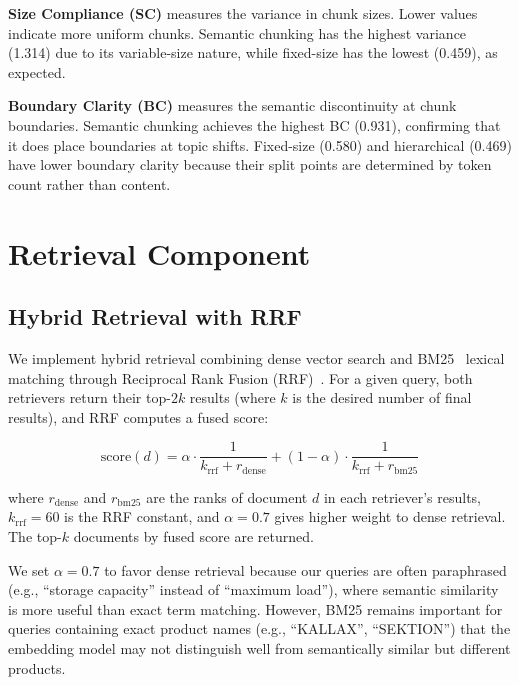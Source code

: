 \documentclass[conference]{IEEEtran}
\begin{document}
\textbf{Size Compliance (SC)} measures the variance in chunk sizes. Lower values indicate more uniform chunks. Semantic chunking has the highest variance (1.314) due to its variable-size nature, while fixed-size has the lowest (0.459), as expected.

\textbf{Boundary Clarity (BC)} measures the semantic discontinuity at chunk boundaries. Semantic chunking achieves the highest BC (0.931), confirming that it does place boundaries at topic shifts. Fixed-size (0.580) and hierarchical (0.469) have lower boundary clarity because their split points are determined by token count rather than content.

\section{Retrieval Component}

\subsection{Hybrid Retrieval with RRF}

We implement hybrid retrieval combining dense vector search and BM25~\cite{b2} lexical matching through Reciprocal Rank Fusion (RRF)~\cite{b3}. For a given query, both retrievers return their top-$2k$ results (where $k$ is the desired number of final results), and RRF computes a fused score:

\begin{equation}
\text{score}(d) = \alpha \cdot \frac{1}{k_{\text{rrf}} + r_{\text{dense}}} + (1-\alpha) \cdot \frac{1}{k_{\text{rrf}} + r_{\text{bm25}}}
\end{equation}

\noindent where $r_{\text{dense}}$ and $r_{\text{bm25}}$ are the ranks of document $d$ in each retriever's results, $k_{\text{rrf}}=60$ is the RRF constant, and $\alpha=0.7$ gives higher weight to dense retrieval. The top-$k$ documents by fused score are returned.

We set $\alpha=0.7$ to favor dense retrieval because our queries are often paraphrased (e.g., ``storage capacity'' instead of ``maximum load''), where semantic similarity is more useful than exact term matching. However, BM25 remains important for queries containing exact product names (e.g., ``KALLAX'', ``SEKTION'') that the embedding model may not distinguish well from semantically similar but different products.
\end{document}
